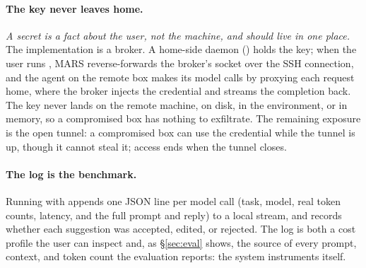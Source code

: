 \paragraph{The key never leaves home.}
\emph{A secret is a fact about the user, not the machine, and should live in one place.}
The implementation is a broker. A home-side daemon ()
holds the key; when the user runs , MARS reverse-forwards the broker's
socket over the SSH connection, and the agent on the remote box makes its model calls by
proxying each request home, where the broker injects the credential and streams the
completion back. The key never lands on the remote machine, on disk, in the environment,
or in memory, so a compromised box has nothing to exfiltrate. The remaining exposure is
the open tunnel: a compromised box can use the credential while the tunnel is up, though
it cannot steal it; access ends when the tunnel closes.

\paragraph{The log is the benchmark.}
Running with  appends one JSON line per model call (task, model, real
token counts, latency, and the full prompt and reply) to a local stream, and records
whether each suggestion was accepted, edited, or rejected. The log is both a cost
profile the user can inspect and, as \S\ref{sec:eval} shows, the source of every prompt,
context, and token count the evaluation reports: the system instruments itself.
